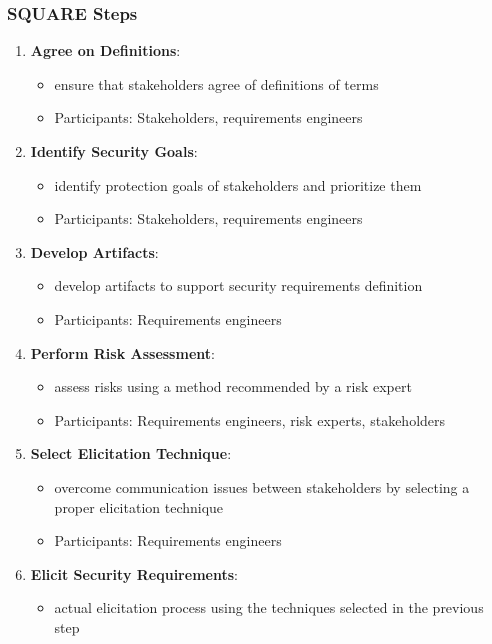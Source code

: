 \documentclass[12pt,A4]{extarticle}
\begin{document}
\subsubsection{SQUARE Steps}
\begin{enumerate}
  \item{\textbf{Agree on Definitions}:
    \begin{itemize}
      \item{ensure that stakeholders agree of definitions of terms}
      \item{Participants: Stakeholders, requirements engineers}
    \end{itemize}
  }
  \item{\textbf{Identify Security Goals}:
    \begin{itemize}
      \item{identify protection goals of stakeholders and prioritize them}
      \item{Participants: Stakeholders, requirements engineers}
    \end{itemize}
  }
  \item{\textbf{Develop Artifacts}:
    \begin{itemize}
      \item{develop artifacts to support security requirements definition}
      \item{Participants: Requirements engineers}
    \end{itemize}
  }
  \item{\textbf{Perform Risk Assessment}:
    \begin{itemize}
      \item{assess risks using a method recommended by a risk expert}
      \item{Participants: Requirements engineers, risk experts, stakeholders}
    \end{itemize}
  }
  \item{\textbf{Select Elicitation Technique}:
    \begin{itemize}
      \item{overcome communication issues between stakeholders by selecting a proper elicitation technique}
      \item{Participants: Requirements engineers}
    \end{itemize}
  }
  \item{\textbf{Elicit Security Requirements}:
    \begin{itemize}
      \item{actual elicitation process using the techniques selected in the previous step}

\end{itemize}}
\end{enumerate}
\end{document}
